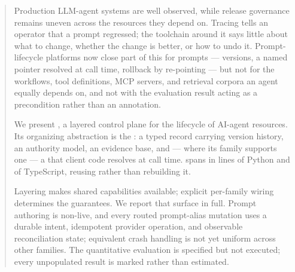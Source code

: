 
\begin{abstract}
Production LLM-agent systems are well observed, while release governance remains
uneven across the resources they depend on. Tracing tells an
operator that a prompt regressed; the toolchain around it says little about what to
change, whether the change is better, or how to undo it. Prompt-lifecycle platforms
now close part of this for prompts --- versions, a named pointer resolved at call
time, rollback by re-pointing --- but not for the workflows, tool definitions, MCP
servers, and retrieval corpora an agent equally depends on, and not with the
evaluation result acting as a precondition rather than an annotation.

We present \sysbare{}, a layered control plane for the lifecycle of AI-agent
resources. Its organizing abstraction is the \emph{\gasset}: a typed record
carrying version history, an authority model, an evidence base, and --- where its
family supports one --- a \livetarget{} that client code resolves at call time.
\sys spans \statFamiliesW{} \families{} in \statPyLoc{} lines of Python and
\statUiLoc{} of TypeScript, reusing \mlflow{} rather than rebuilding it.

Layering makes shared capabilities available; explicit per-family wiring determines
the guarantees. We report that surface in full. Prompt authoring is non-live, and
every routed prompt-alias mutation uses a durable intent, idempotent provider operation,
and observable reconciliation state; equivalent crash handling is not yet uniform
across other families. The quantitative evaluation is specified but not executed;
every unpopulated result is marked rather than estimated.
\end{abstract}

